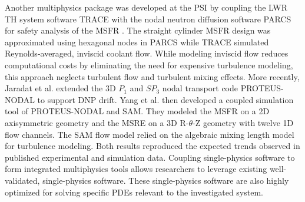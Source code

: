Another multiphysics package was developed at
the \gls{PSI} by coupling the \gls{LWR} \gls{TH} system software \gls{TRACE} \cite{nrc_trace_2007}
with the nodal neutron diffusion software \gls{PARCS} \cite{downar_parcs_2010} for safety
analysis of the \gls{MSFR} \cite{pettersen_coupled_2016}. The straight cylinder \gls{MSFR} design
was approximated using hexagonal nodes in \gls{PARCS} while \gls{TRACE} simulated
Reynolds-averaged, inviscid coolant flow. While modeling inviscid flow reduces computational costs
by eliminating the need for expensive turbulence modeling, this approach neglects turbulent flow
and turbulent mixing effects. More recently, Jaradat et al. \cite{jaradat_development_2021}
extended the 3D $P_1$ and $SP_3$ nodal transport code PROTEUS-NODAL to support \gls{DNP} drift.
Yang et al. \cite{yang_development_2022} then developed a coupled simulation tool of PROTEUS-NODAL
and \gls{SAM}. They modeled the \gls{MSFR} on a 2D axisymmetric geometry
and the \gls{MSRE} on a 3D R-$\theta$-Z geometry with twelve 1D flow channels. The \gls{SAM} flow
model relied on the algebraic mixing length model for turbulence modeling. Both results
reproduced the expected trends observed in published experimental and simulation data. Coupling
single-physics software to form integrated multiphysics tools allows researchers to leverage
existing well-validated, single-physics software. These single-physics software are also highly
optimized for solving specific \glspl{PDE} relevant to the investigated system.

